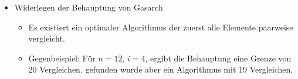 \begin{frame}
  \begin{itemize}
    \item Widerlegen der Behauptung von Gasarch
          \begin{itemize}
            \item Es existiert ein optimaler Algorithmus der zuerst alle Elemente paarweise vergleicht.
            \item Gegenbeispiel: Für $n = 12$, $i = 4$, ergibt die Behauptung eine Grenze von 20
                  Vergleichen, gefunden wurde aber ein Algorithmus mit 19 Vergleichen.
          \end{itemize}
  \end{itemize}
\end{frame}

\thanksframe

